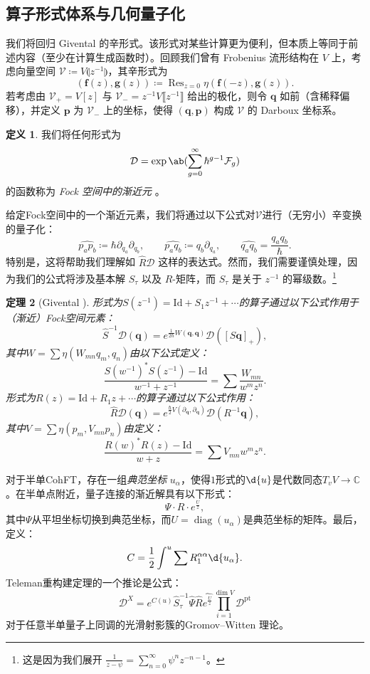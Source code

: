 \documentclass{amsart}
\newtheorem{thm}{定理}[section]
\theoremstyle{definition}
\newtheorem{defn}[thm]{定义}
\theoremstyle{remark}
\theoremstyle{plain}
\theoremstyle{definition}
\theoremstyle{remark}
\newcommand{\C}{\mathbb{C}}
\newcommand{\mc}[1]{\mathcal{#1}}
\newcommand{\mbf}[1]{\mathbf{#1}}
\newcommand{\bq}{\mbf{q}}
\newcommand{\bp}{\mbf{p}}
\newcommand{\mr}[1]{\mathrm{#1}}
\newcommand{\on}[1]{\operatorname{#1}}
\newcommand{\wh}[1]{\widehat{#1}}
\newcommand{\1}{\mathbf{1}}
\newcommand{\2}{\mathbf{2}}
\newcommand{\3}{\mathbf{3}}
\newcommand{\ps}[1]{\llbracket #1 \rrbracket}
\newcommand{\ls}[1]{\llparenthesis #1 \rrparenthesis}
\begin{document}
\subsection{算子形式体系与几何量子化}%
\label{sub:Operator formalism and geometric quantization}

我们将回归 Givental 的辛形式。该形式对某些计算更为便利，但本质上等同于前述内容（至少在计算生成函数时）。回顾我们曾有 Frobenius 流形结构在 $V$ 上，考虑向量空间 $\mc{V}\coloneqq V\ls{z^{-1}}$，其辛形式为
\[ (\mbf{f}(z), \mbf{g}(z)) \coloneqq \on{Res}_{z=0} \eta(\mbf{f}(-z), \mbf{g}(z)). \]
若考虑由 $\mc{V}_+ = V[z]$ 与 $\mc{V}_- = z^{-1}V\ps{z^{-1}}$ 给出的极化，则令 $\bq$ 如前（含稀释偏移），并定义 $\bp$ 为 $\mc{V}_-$ 上的坐标，使得 $(\bq, \bp)$ 构成 $\mc{V}$ 的 Darboux 坐标系。

\begin{defn}
我们将任何形式为
    \[ \mc{D} = \exp\ab(\sum_{g=0}^{\infty} \hbar^{g-1} \mc{F}_g) \]
的函数称为 \textit{ Fock 空间中的渐近元 }。
\end{defn}

给定Fock空间中的一个渐近元素，我们将通过以下公式对$\mc{V}$进行（无穷小）辛变换的量子化：
\[ \wh{p_a p_b} \coloneqq \hbar \partial_{q_a} \partial_{q_b}, \qquad \wh{p_a q_b} \coloneqq q_b \partial_{q_a}, \qquad \wh{q_a q_b} = \frac{q_a q_b}{\hbar}. \]
特别是，这将帮助我们理解如 $\hat{R} \mc{D}$ 这样的表达式。然而，我们需要谨慎处理，因为我们的公式将涉及基本解 $S_{\tau}$ 以及 $R$-矩阵，而 $S_{\tau}$ 是关于 $z^{-1}$ 的幂级数。\footnote{ 这是因为我们展开 $\frac{1}{z-\psi} = \sum_{n=0}^{\infty} \psi^n z^{-n-1}$。}

\begin{thm}[Givental {\cite{Givental2001quantization}}]
形式为$S(z^{-1}) = \mr{Id} + S_1 z^{-1} + \cdots$的算子通过以下公式作用于（渐近）Fock空间元素：
    \[ \hat{S}^{-1} \mc{D}(\bq) = e^{\frac{1}{2\hbar}W(\bq,\bq)} \mc{D}([S \bq]_+), \]
其中$W = \sum \eta(W_{mn}q_m, q_n)$由以下公式定义：
    \[ \frac{S(w^{-1})^* S(z^{-1}) - \mr{Id}}{w^{-1}+z^{-1}} = \sum \frac{W_{mn}}{w^m z^n}. \]
形式为$R(z) = \mr{Id} + R_1 z + \cdots$的算子通过以下公式作用：
    \[ \hat{R}\mc{D}(\bq) = e^{\frac{\hbar}{2} V(\partial_{\bq}, \partial_{\bq})} \mc{D}(R^{-1} \bq), \]
其中$V = \sum \eta(p_m, V_{mn} p_n)$由定义：
    \[ \frac{R(w)^* R(z) - \mr{Id}}{w+z} = \sum V_{mn} w^m z^n. \]
\end{thm}

对于半单CohFT，存在一组\textit{典范坐标} $u_{\alpha}$，使得$1$形式的$\d{u}$是代数同态$T_v V \to \C$。在半单点附近，量子连接的渐近解具有以下形式：
\[ \Psi \cdot  R \cdot e^{\frac{U}{z}}, \]
其中$\Psi$从平坦坐标切换到典范坐标，而$U = \on{diag}(u_{\alpha})$是典范坐标的矩阵。最后，定义：
\[ C = \frac{1}{2} \int^u \sum R_1^{\alpha\alpha} \d{u_{\alpha}}. \]
Teleman重构建定理的一个推论是公式：
\[ \mc{D}^X = e^{C(u)} \hat{S}^{-1}_{\tau} \hat{\Psi} \hat{R} \wh{e^{\frac{U}{z}}} \prod_{i=1}^{\dim V} \mc{D}^{\mr{pt}} \]
对于任意半单量子上同调的光滑射影簇的Gromov--Witten 理论。
\end{document}
